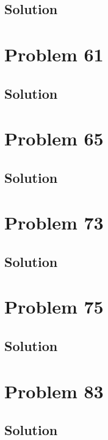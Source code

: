 \documentclass[12pt]{article}
\begin{document}
        \subsection{Solution}

    \pagebreak
    \section{Problem 61}

        \subsection{Solution}

    \pagebreak
    \section{Problem 65}

        \subsection{Solution}

    \pagebreak
    \section{Problem 73}

        \subsection{Solution}

    \pagebreak
    \section{Problem 75}

        \subsection{Solution}

    \pagebreak
    \section{Problem 83}

        \subsection{Solution}

    \pagebreak

    \tableofcontents
    
\end{document}

